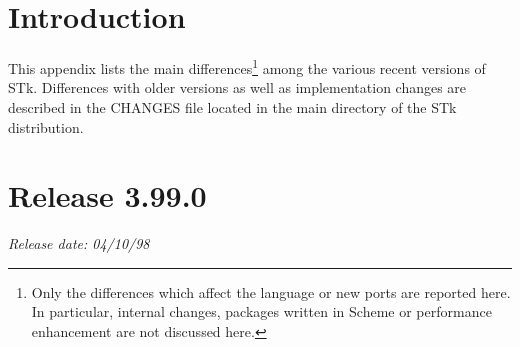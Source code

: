 %
%
%

\section*{Introduction}

This appendix lists the main differences\footnote{ Only the
  differences which affect the language or new ports are reported here.
  In particular, internal changes, packages written in Scheme or
  performance enhancement are not discussed here.} among the various
recent versions of STk.  Differences with older versions as well as
implementation changes are described in the CHANGES file located in
the main directory of the STk distribution.

\section*{Release 3.99.0}
\small{\emph{Release date: 04/10/98}}

